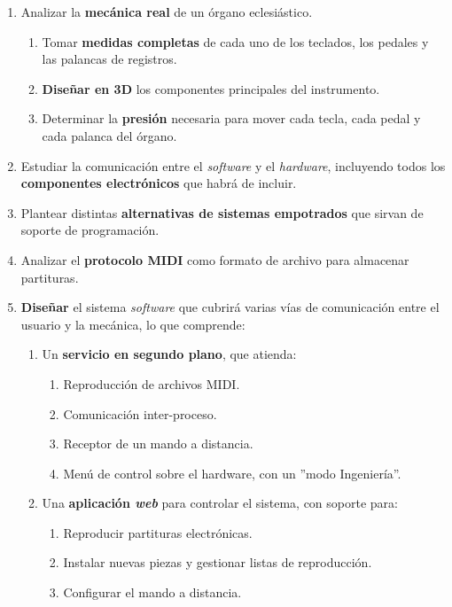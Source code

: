 \documentclass[10pt,a4paper]{article}
\begin{document}
	\begin{enumerate}
		\item Analizar la \textbf{mecánica real} de un órgano eclesiástico.
		
		\begin{enumerate}
			\item Tomar \textbf{medidas completas} de cada uno de los teclados,
			los pedales y las palancas de registros.
			\item \textbf{Diseñar en 3D} los componentes principales del
			instrumento.
			\item Determinar la \textbf{presión} necesaria para mover cada
			tecla, cada pedal y cada palanca del órgano.
		\end{enumerate}
		
		\item Estudiar la comunicación entre el \textit{software} y el
		\textit{hardware}, incluyendo todos los \textbf{componentes
		electrónicos} que habrá de incluir.
		
		\item Plantear distintas \textbf{alternativas de sistemas empotrados}
		que sirvan de soporte de programación.
		
		\item Analizar el \textbf{protocolo MIDI} como formato de archivo para
		almacenar partituras.
		
		\item \textbf{Diseñar} el sistema \textit{software} que cubrirá varias
		vías de comunicación entre el usuario y la mecánica, lo que comprende:
		
		\begin{enumerate}
			\item Un \textbf{servicio en segundo plano}, que atienda:
			
			\begin{enumerate}
				\item Reproducción de archivos MIDI.
				\item Comunicación inter-proceso.
				\item Receptor de un mando a distancia.
				\item Menú de control sobre el hardware, con un ''modo
				Ingeniería''.
			\end{enumerate}
			
			\item Una \textbf{aplicación \textit{web}} para controlar el
			sistema, con soporte para:
			
			\begin{enumerate}
				\item Reproducir partituras electrónicas.
				\item Instalar nuevas piezas y gestionar listas de reproducción.
				\item Configurar el mando a distancia.
			\end{enumerate}
			

\end{enumerate}
\end{enumerate}
\end{document}
